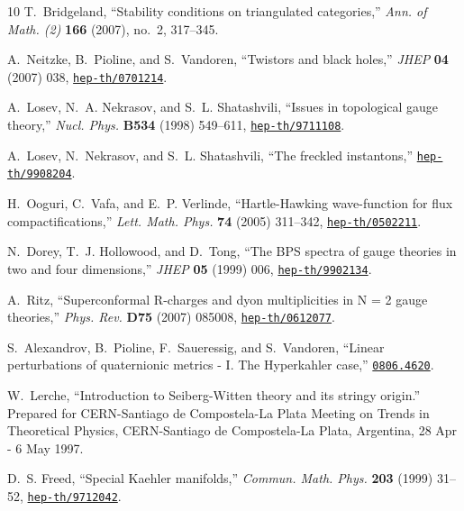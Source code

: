 \begin{thebibliography}{10}
T.~Bridgeland, ``Stability conditions on triangulated categories,'' {\em Ann.
  of Math. (2)} {\bf 166} (2007), no.~2, 317--345.

A.~Neitzke, B.~Pioline, and S.~Vandoren, ``Twistors and black holes,'' {\em
  JHEP} {\bf 04} (2007) 038,
\href{http://www.arXiv.org/abs/hep-th/0701214}{{\tt hep-th/0701214}}.

A.~Losev, N.~A. Nekrasov, and S.~L. Shatashvili, ``Issues in topological gauge
  theory,'' {\em Nucl. Phys.} {\bf B534} (1998) 549--611,
\href{http://www.arXiv.org/abs/hep-th/9711108}{{\tt hep-th/9711108}}.

A.~Losev, N.~Nekrasov, and S.~L. Shatashvili, ``{The freckled instantons},''
\href{http://www.arXiv.org/abs/hep-th/9908204}{{\tt hep-th/9908204}}.

H.~Ooguri, C.~Vafa, and E.~P. Verlinde, ``{H}artle-{H}awking wave-function for
  flux compactifications,'' {\em Lett. Math. Phys.} {\bf 74} (2005) 311--342,
\href{http://www.arXiv.org/abs/hep-th/0502211}{{\tt hep-th/0502211}}.

N.~Dorey, T.~J. Hollowood, and D.~Tong, ``{The BPS spectra of gauge theories in
  two and four dimensions},'' {\em JHEP} {\bf 05} (1999) 006,
\href{http://www.arXiv.org/abs/hep-th/9902134}{{\tt hep-th/9902134}}.

A.~Ritz, ``{Superconformal R-charges and dyon multiplicities in N = 2 gauge
  theories},'' {\em Phys. Rev.} {\bf D75} (2007) 085008,
\href{http://www.arXiv.org/abs/hep-th/0612077}{{\tt hep-th/0612077}}.

S.~Alexandrov, B.~Pioline, F.~Saueressig, and S.~Vandoren, ``{Linear
  perturbations of quaternionic metrics - {I}. The Hyperkahler case},''
\href{http://www.arXiv.org/abs/0806.4620}{{\tt 0806.4620}}.

W.~Lerche, ``{Introduction to Seiberg-Witten theory and its stringy origin}.''
\newblock Prepared for CERN-Santiago de Compostela-La Plata Meeting on Trends
  in Theoretical Physics, CERN-Santiago de Compostela-La Plata, Argentina, 28
  Apr - 6 May 1997.

D.~S. Freed, ``{Special Kaehler manifolds},'' {\em Commun. Math. Phys.} {\bf
  203} (1999) 31--52,
\href{http://www.arXiv.org/abs/hep-th/9712042}{{\tt hep-th/9712042}}.


\end{thebibliography}

